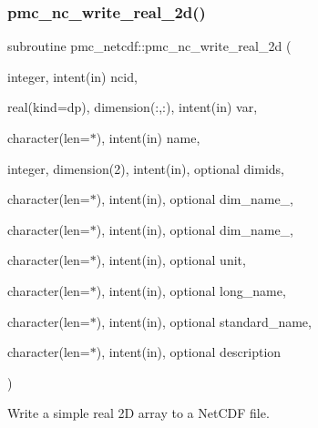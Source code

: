 \subsubsection{\texorpdfstring{pmc\+\_\+nc\+\_\+write\+\_\+real\+\_\+2d()}{pmc\_nc\_write\_real\_2d()}}
{\footnotesize\ttfamily subroutine pmc\+\_\+netcdf\+::pmc\+\_\+nc\+\_\+write\+\_\+real\+\_\+2d (\begin{DoxyParamCaption}\item[{integer, intent(in)}]{ncid,  }\item[{real(kind=dp), dimension(\+:,\+:), intent(in)}]{var,  }\item[{character(len=$\ast$), intent(in)}]{name,  }\item[{integer, dimension(2), intent(in), optional}]{dimids,  }\item[{character(len=$\ast$), intent(in), optional}]{dim\+\_\+name\+\_,  }\item[{character(len=$\ast$), intent(in), optional}]{dim\+\_\+name\+\_,  }\item[{character(len=$\ast$), intent(in), optional}]{unit,  }\item[{character(len=$\ast$), intent(in), optional}]{long\+\_\+name,  }\item[{character(len=$\ast$), intent(in), optional}]{standard\+\_\+name,  }\item[{character(len=$\ast$), intent(in), optional}]{description }\end{DoxyParamCaption})}



Write a simple real 2D array to a Net\+C\+DF file. 


